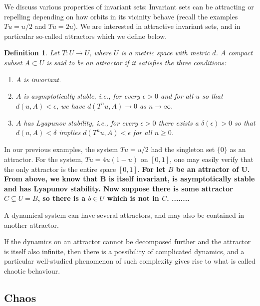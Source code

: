 \documentclass[12 pt]{article}
\newtheorem{Definition}{Definition}[]
\begin{document}
We discuss various properties of invariant sets: Invariant sets can be attracting or repelling depending on how orbits in its vicinity behave (recall the examples $Tu =u/2$ and $Tu=2u$). We are interested in attractive invariant sets, and in particular so-called attractors which we define below.
\begin{Definition} \rm Let $T: U \to U$, where $U$  is a metric space with metric $d$. A compact subset $A \subset U$ is said to be an attractor if it satisfies the three conditions: 
  \vspace{-8mm}
  \begin{enumerate}
	\item $A$ is invariant. 
	\item $A$ is asymptotically stable, i.e., for every $\epsilon > 0$ and for all $u$ so that $d(u,A) < \epsilon$, we have $d(T^nu,A) \to 0$ as $n\to \infty$. 
	\item $A$ has Lyapunov stability, i.e., for every $\epsilon > 0$  there exists a $\delta(\epsilon) > 0$ so that $d(u,A) < \delta$ implies $d(T^nu,A) < \epsilon$ for all $n\ge 0$.  
\end{enumerate}
\end{Definition} 

In our previous examples, the system  $Tu=u/2$ had the singleton set $\{0\}$ as an attractor. For the system,  $Tu=4u(1-u)$ on $[0,1]$, one may easily verify that the only attractor is the entire space $[0,1]$. \textbf{For let $B$ be an attractor of U. From above, we know that B is itself invariant, is asymptotically stable and has Lyapunov stability. Now suppose there is some attractor $C\subsetneq{U}=B$, so there is a $b\in{U}$ which is not in $C$. ........  }

A dynamical system can have several attractors, and may also be contained in another attractor. 


If the dynamics on an attractor cannot be decomposed further and the attractor is itself also infinite, then there is a possibility of complicated dynamics, and a particular well-studied phenomenon of such complexity gives rise to what is called chaotic behaviour. 

\subsection{Chaos}
\end{document}
